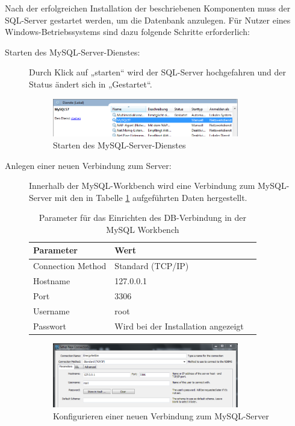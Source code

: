 \documentclass[12pt,titlepage]{article}
\begin{document}
Nach der erfolgreichen Installation der beschriebenen Komponenten muss der SQL-Server gestartet werden, um die Datenbank anzulegen. Für Nutzer eines Windows-Betriebssystems sind dazu folgende Schritte erforderlich:

\begin{description}
\item [Starten des MySQL-Server-Dienstes:]
Durch Klick auf „starten“ wird der SQL-Server hochgefahren und der Status ändert sich in „Gestartet“.
\begin{figure}[!ht]
	\centering
	\includegraphics[width=0.8\textwidth]{ErgSoftwareInst2}
	\caption{Starten des MySQL-Server-Dienstes}
	\label{fig:ErgSoftwareInst2}
\end{figure}
\item [Anlegen einer neuen Verbindung zum Server:]
Innerhalb der MySQL-Workbench wird eine Verbindung zum MySQL-Server mit den in Tabelle \ref{tab:mysql} aufgeführten Daten hergestellt.
\begin{table}[htp!] 
\centering
	 \begin{tabular}{|l|l|l|} 
	 \hline
	Parameter & Wert\\
	\hline
	\hline
	Connection Method & Standard (TCP/IP)\\
	 \hline
	Hostname & 127.0.0.1\\
	 \hline
	Port & 3306\\
	 \hline
	Username & root\\
	 \hline
	Passwort & Wird bei der Installation angezeigt\\
	 \hline
	 \end{tabular}
\caption{Parameter für das Einrichten des DB-Verbindung in der MySQL Workbench}
\label{tab:mysql}
\end{table}
\begin{figure}[!ht]
	\centering
	\includegraphics[width=0.8\textwidth]{ErgSoftwareInst3}
	\caption{Konfigurieren einer neuen Verbindung zum MySQL-Server}

\end{figure}
\end{description}
\end{document}
